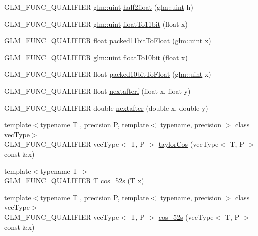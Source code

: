 \begin{DoxyCompactItemize}
\item 
G\+L\+M\+\_\+\+F\+U\+N\+C\+\_\+\+Q\+U\+A\+L\+I\+F\+I\+E\+R \hyperlink{stb__image_8c_a91ad9478d81a7aaf2593e8d9c3d06a14}{glm\+::uint} \hyperlink{namespaceglm_1_1detail_a69b64ab4be52c9601b31588c8c813ca0}{half2float} (\hyperlink{stb__image_8c_a91ad9478d81a7aaf2593e8d9c3d06a14}{glm\+::uint} h)
\item 
G\+L\+M\+\_\+\+F\+U\+N\+C\+\_\+\+Q\+U\+A\+L\+I\+F\+I\+E\+R \hyperlink{stb__image_8c_a91ad9478d81a7aaf2593e8d9c3d06a14}{glm\+::uint} \hyperlink{namespaceglm_1_1detail_a62edbdbe89fe6282dd7909e6e4703796}{float\+To11bit} (float x)
\item 
G\+L\+M\+\_\+\+F\+U\+N\+C\+\_\+\+Q\+U\+A\+L\+I\+F\+I\+E\+R float \hyperlink{namespaceglm_1_1detail_a0148d59bbb6dbf6c0f296e73a527c225}{packed11bit\+To\+Float} (\hyperlink{stb__image_8c_a91ad9478d81a7aaf2593e8d9c3d06a14}{glm\+::uint} x)
\item 
G\+L\+M\+\_\+\+F\+U\+N\+C\+\_\+\+Q\+U\+A\+L\+I\+F\+I\+E\+R \hyperlink{stb__image_8c_a91ad9478d81a7aaf2593e8d9c3d06a14}{glm\+::uint} \hyperlink{namespaceglm_1_1detail_a2be3138712a0811602a183614221ad5c}{float\+To10bit} (float x)
\item 
G\+L\+M\+\_\+\+F\+U\+N\+C\+\_\+\+Q\+U\+A\+L\+I\+F\+I\+E\+R float \hyperlink{namespaceglm_1_1detail_afddea7fa02b61b01129777a21380edf4}{packed10bit\+To\+Float} (\hyperlink{stb__image_8c_a91ad9478d81a7aaf2593e8d9c3d06a14}{glm\+::uint} x)
\item 
G\+L\+M\+\_\+\+F\+U\+N\+C\+\_\+\+Q\+U\+A\+L\+I\+F\+I\+E\+R float \hyperlink{namespaceglm_1_1detail_ab0eb795c482130b1d6c83470bdb031e6}{nextafterf} (float x, float y)
\item 
G\+L\+M\+\_\+\+F\+U\+N\+C\+\_\+\+Q\+U\+A\+L\+I\+F\+I\+E\+R double \hyperlink{namespaceglm_1_1detail_a3c14f8400407e8b4cff5be12ceef2c1e}{nextafter} (double x, double y)
\item 
{\footnotesize template$<$typename T , precision P, template$<$ typename, precision $>$ class vec\+Type$>$ }\\G\+L\+M\+\_\+\+F\+U\+N\+C\+\_\+\+Q\+U\+A\+L\+I\+F\+I\+E\+R vec\+Type$<$ T, P $>$ \hyperlink{namespaceglm_1_1detail_a4a16281a64def18b20ab307b516095c2}{taylor\+Cos} (vec\+Type$<$ T, P $>$ const \&x)
\item 
{\footnotesize template$<$typename T $>$ }\\G\+L\+M\+\_\+\+F\+U\+N\+C\+\_\+\+Q\+U\+A\+L\+I\+F\+I\+E\+R T \hyperlink{namespaceglm_1_1detail_a09055f8d723109dc95c8cc2309e20acc}{cos\+\_\+52s} (T x)
\item 
{\footnotesize template$<$typename T , precision P, template$<$ typename, precision $>$ class vec\+Type$>$ }\\G\+L\+M\+\_\+\+F\+U\+N\+C\+\_\+\+Q\+U\+A\+L\+I\+F\+I\+E\+R vec\+Type$<$ T, P $>$ \hyperlink{namespaceglm_1_1detail_ad0c49f46dc1033d16811b2b90f1dcc64}{cos\+\_\+52s} (vec\+Type$<$ T, P $>$ const \&x)

\end{DoxyCompactItemize}
